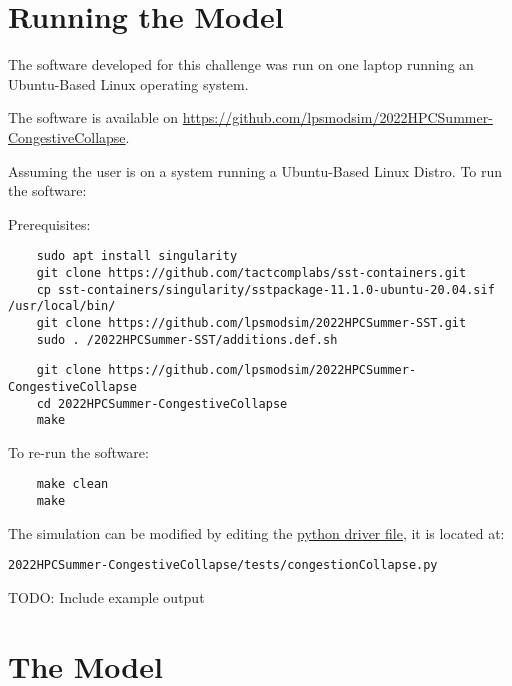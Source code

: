 \documentclass{article}
\begin{document}
\section{Running the Model}

The software developed for this challenge was run on one laptop running an Ubuntu-Based Linux operating system.

\noindent The software is available on \href{https://github.com/lpsmodsim/2022HPCSummer-CongestiveCollapse}{https://github.com/lpsmodsim/2022HPCSummer-CongestiveCollapse}.\newline

\noindent Assuming the user is on a system running a Ubuntu-Based Linux Distro. To run the software:\newline

\noindent Prerequisites: 

\begin{verbatim}
	sudo apt install singularity
	git clone https://github.com/tactcomplabs/sst-containers.git
	cp sst-containers/singularity/sstpackage-11.1.0-ubuntu-20.04.sif /usr/local/bin/
	git clone https://github.com/lpsmodsim/2022HPCSummer-SST.git
	sudo . /2022HPCSummer-SST/additions.def.sh
\end{verbatim}

\begin{verbatim}
	git clone https://github.com/lpsmodsim/2022HPCSummer-CongestiveCollapse
	cd 2022HPCSummer-CongestiveCollapse
	make
\end{verbatim}

\noindent To re-run the software:

\begin{verbatim}
	make clean
	make
\end{verbatim}

\noindent The simulation can be modified by editing the \href{http://sst-simulator.org/SSTPages/SSTUserPythonFileFormat/}{python driver file}, it is located at:

\begin{verbatim}
2022HPCSummer-CongestiveCollapse/tests/congestionCollapse.py
\end{verbatim}

\noindent TODO: Include example output\newline

\section{The Model}
\end{document}
